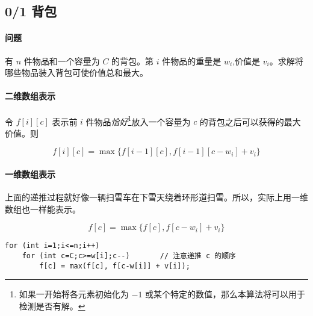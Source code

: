 \subsection{0/1 背包}
	\paragraph{问题} 有 $n$ 件物品和一个容量为 $C$ 的背包。第 $i$ 件物品的重量是 $w_i$,价值是 $v_i$。求解将哪些物品装入背包可使价值总和最大。
	
    \paragraph{二维数组表示} 令 $f[i][c]$ 表示前 $i$ 件物品\emph{恰好}\footnote{如果一开始将各元素初始化为 $-1$ 或某个特定的数值，那么本算法将可以用于检测是否有解。}放入一个容量为 $c$ 的背包之后可以获得的最大价值。则
		
		\[ f[i][c]=\max\{f[i-1][c], f[i-1][c-w_i]+v_i\} \]
		
    \paragraph{一维数组表示} 上面的递推过程就好像一辆扫雪车在下雪天绕着环形道扫雪。所以，实际上用一维数组也一样能表示。
		
		\[ f[c] = \max\{f[c], f[c-w_i]+v_i\} \]

\begin{lstlisting}
for (int i=1;i<=n;i++)
	for (int c=C;c>=w[i];c--)		// 注意递推 c 的顺序
		f[c] = max(f[c], f[c-w[i]] + v[i]);
\end{lstlisting}
